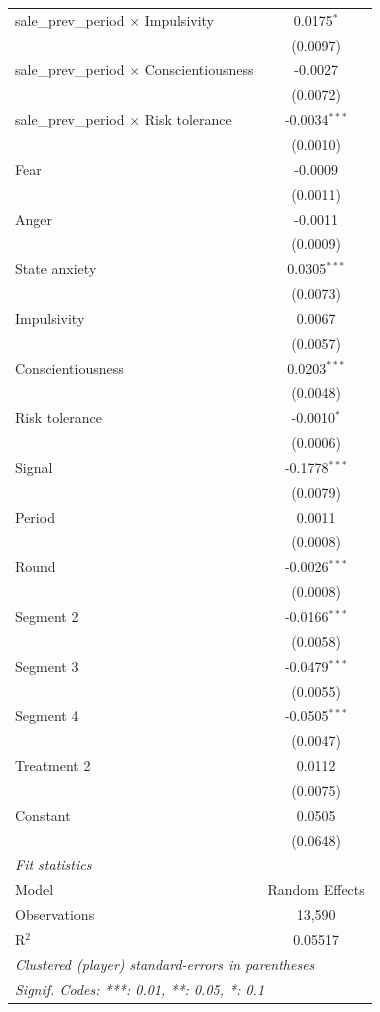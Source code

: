 \begin{longtable}{lc}
   sale\_prev\_period $\times$ Impulsivity& 0.0175$^{*}$\\
                       & (0.0097)\\
   sale\_prev\_period $\times$ Conscientiousness& -0.0027\\
                       & (0.0072)\\
   sale\_prev\_period $\times$ Risk tolerance& -0.0034$^{***}$\\
                       & (0.0010)\\
   Fear                & -0.0009\\
                       & (0.0011)\\
   Anger               & -0.0011\\
                       & (0.0009)\\
   State anxiety       & 0.0305$^{***}$\\
                       & (0.0073)\\
   Impulsivity         & 0.0067\\
                       & (0.0057)\\
   Conscientiousness   & 0.0203$^{***}$\\
                       & (0.0048)\\
   Risk tolerance      & -0.0010$^{*}$\\
                       & (0.0006)\\
   Signal              & -0.1778$^{***}$\\
                       & (0.0079)\\
   Period              & 0.0011\\
                       & (0.0008)\\
   Round               & -0.0026$^{***}$\\
                       & (0.0008)\\
   Segment 2           & -0.0166$^{***}$\\
                       & (0.0058)\\
   Segment 3           & -0.0479$^{***}$\\
                       & (0.0055)\\
   Segment 4           & -0.0505$^{***}$\\
                       & (0.0047)\\
   Treatment 2         & 0.0112\\
                       & (0.0075)\\
   Constant            & 0.0505\\
                       & (0.0648)\\
   \midrule
   \emph{Fit statistics}\\
   Model              & Random Effects\\
   Observations       & 13,590\\
   R$^2$              & 0.05517\\
   \midrule \midrule
   \multicolumn{2}{l}{\emph{Clustered (player) standard-errors in parentheses}}\\
   \multicolumn{2}{l}{\emph{Signif. Codes: ***: 0.01, **: 0.05, *: 0.1}}\\
\end{longtable}
\endgroup


